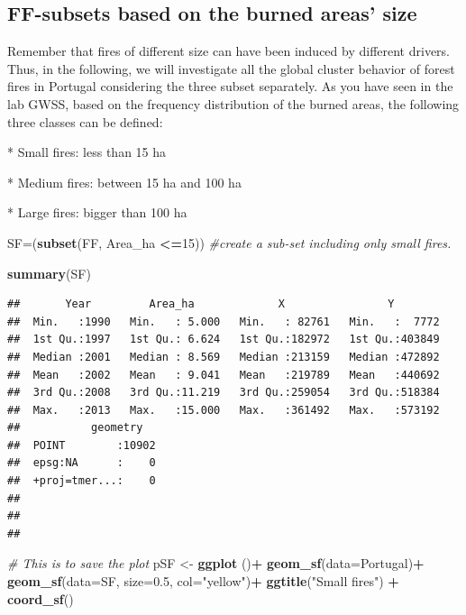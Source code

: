 \documentclass[
]{book}
\newenvironment{Shaded}{\begin{snugshade}}{\end{snugshade}}
\newcommand{\AttributeTok}[1]{\textcolor[rgb]{0.13,0.29,0.53}{#1}}
\newcommand{\CommentTok}[1]{\textcolor[rgb]{0.56,0.35,0.01}{\textit{#1}}}
\newcommand{\DecValTok}[1]{\textcolor[rgb]{0.00,0.00,0.81}{#1}}
\newcommand{\FloatTok}[1]{\textcolor[rgb]{0.00,0.00,0.81}{#1}}
\newcommand{\FunctionTok}[1]{\textcolor[rgb]{0.13,0.29,0.53}{\textbf{#1}}}
\newcommand{\NormalTok}[1]{#1}
\newcommand{\OtherTok}[1]{\textcolor[rgb]{0.56,0.35,0.01}{#1}}
\newcommand{\SpecialCharTok}[1]{\textcolor[rgb]{0.81,0.36,0.00}{\textbf{#1}}}
\newcommand{\StringTok}[1]{\textcolor[rgb]{0.31,0.60,0.02}{#1}}
\begin{document}
\hypertarget{ff-subsets-based-on-the-burned-areas-size}{%
\subsection{FF-subsets based on the burned areas' size}\label{ff-subsets-based-on-the-burned-areas-size}}

Remember that fires of different size can have been induced by different drivers.
Thus, in the following, we will investigate all the global cluster behavior of forest fires in Portugal considering the three subset separately.
As you have seen in the lab GWSS, based on the frequency distribution of the burned areas, the following three classes can be defined:

* Small fires: less than 15 ha

* Medium fires: between 15 ha and 100 ha

* Large fires: bigger than 100 ha

\begin{Shaded}
\begin{Highlighting}[]
\NormalTok{SF}\OtherTok{=}\NormalTok{(}\FunctionTok{subset}\NormalTok{(FF, Area\_ha }\SpecialCharTok{\textless{}=}\DecValTok{15}\NormalTok{)) }\CommentTok{\#create a sub{-}set including only small fires. }

\FunctionTok{summary}\NormalTok{(SF)}
\end{Highlighting}
\end{Shaded}

\begin{verbatim}
##       Year         Area_ha             X                Y         
##  Min.   :1990   Min.   : 5.000   Min.   : 82761   Min.   :  7772  
##  1st Qu.:1997   1st Qu.: 6.624   1st Qu.:182972   1st Qu.:403849  
##  Median :2001   Median : 8.569   Median :213159   Median :472892  
##  Mean   :2002   Mean   : 9.041   Mean   :219789   Mean   :440692  
##  3rd Qu.:2008   3rd Qu.:11.219   3rd Qu.:259054   3rd Qu.:518384  
##  Max.   :2013   Max.   :15.000   Max.   :361492   Max.   :573192  
##           geometry    
##  POINT        :10902  
##  epsg:NA      :    0  
##  +proj=tmer...:    0  
##                       
##                       
## 
\end{verbatim}

\begin{Shaded}
\begin{Highlighting}[]
\CommentTok{\# This is to save the plot }
\NormalTok{pSF }\OtherTok{\textless{}{-}} \FunctionTok{ggplot}\NormalTok{ ()}\SpecialCharTok{+}
  \FunctionTok{geom\_sf}\NormalTok{(}\AttributeTok{data=}\NormalTok{Portugal)}\SpecialCharTok{+}
  \FunctionTok{geom\_sf}\NormalTok{(}\AttributeTok{data=}\NormalTok{SF, }\AttributeTok{size=}\FloatTok{0.5}\NormalTok{, }\AttributeTok{col=}\StringTok{"yellow"}\NormalTok{)}\SpecialCharTok{+}
 \FunctionTok{ggtitle}\NormalTok{(}\StringTok{"Small fires"}\NormalTok{) }\SpecialCharTok{+}
 \FunctionTok{coord\_sf}\NormalTok{()}
\end{Highlighting}
\end{Shaded}
\end{document}
